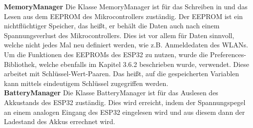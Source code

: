 \documentclass[11pt, twoside]{article}
\begin{document}
\vspace{4mm}\newline
\textbf{MemoryManager} \newline
Die Klasse \glqq MemoryManager\grqq{} ist für das Schreiben in und das Lesen aus dem EEPROM des Mikrocontrollers zuständig. Der EEPROM ist ein nichtflüchtiger Speicher, das heißt, er behält die Daten auch nach einem Spannungsverlust des Mikrocontrollers. Dies ist vor allem für Daten sinnvoll, welche nicht jedes Mal neu definiert werden, wie z.B. Anmeldedaten des WLANs. \parencite[vgl.][]{santos_urlpi27_2018}
Um die Funktionen des EEPROMs des ESP32 zu nutzen, wurde die \glqq Preferences\grqq{}-Bibliothek, welche ebenfalls im Kapitel 3.6.2 beschrieben wurde, verwendet. Diese arbeitet mit Schlüssel-Wert-Paaren. Das heißt, auf die gespeicherten Variablen kann mittels eindeutigem Schlüssel zugegriffen werden.
\newline \\
\textbf{BatteryManager} \newline
Die Klasse \glqq BatteryManager\grqq{} ist für das Auslesen des Akkustands des ESP32 zuständig. Dies wird erreicht, indem der Spannungspegel an einem analogen Eingang des ESP32 eingelesen wird und aus diesem dann der Ladestand des Akkus errechnet wird.
\end{document}
